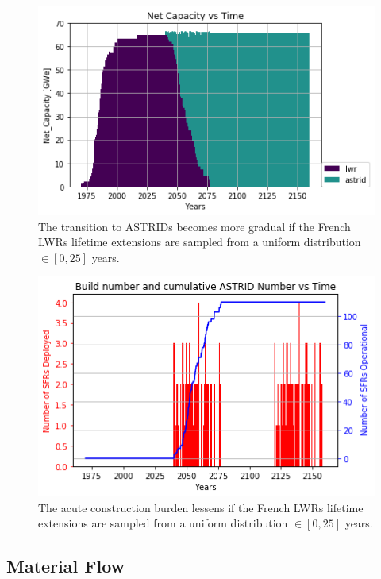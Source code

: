 \begin{figure}[htbp!]
    \begin{center}
        \includegraphics[scale=0.6]{./images/french-transition/unif_0_25.png}
    \end{center}
    \caption{The transition to \glspl{ASTRID}
             becomes more gradual if the
             French \glspl{LWR} lifetime extensions are sampled from a 
     uniform distribution $\in [0, 25]$ years.}
    \label{fig:sfr_num_norm}
\end{figure}

\begin{figure}[htbp!]
    \begin{center}
        \includegraphics[scale=0.6]{./images/french-transition/unif_0_25_dep.png}
    \end{center}
    \caption{The acute construction burden lessens if the
             French \glspl{LWR} lifetime extensions are sampled from a 
     uniform distribution $\in [0, 25]$ years.}
    \label{fig:sfr_dep_norm}
\end{figure}

\subsection{Material Flow}

